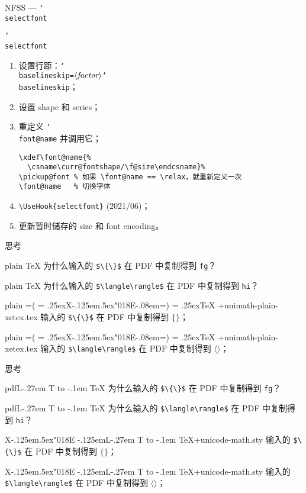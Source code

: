 \documentclass{beamer}
\makeatletter
\DeclareRobustCommand\LaTeX{L\kern-.27em%
  {\sbox\z@ T%
   \vbox to\ht\z@{\hbox{\check@mathfonts
                        \fontsize\sf@size\z@
                        \math@fontsfalse\selectfont
                        A}%
                  \vss}%
  }%
  \kern-.1em%
  \TeX}
\DeclareRobustCommand\xe{X\kern-.125em\lower.5ex\hbox{\char"018E}\kern-.08em}
\DeclareRobustCommand\xelatex{X\kern-.125em\lower.5ex\hbox{\char"018E}%
  \kern-.125em\LaTeX}
\DeclareRobustCommand\pdflatex{pdf\LaTeX}
\DeclareRobustCommand\exfall[2][.25]{\setbox0=\hbox{#2}%
  \dp0=\z@
  \leavevmode@ifvmode\lower#1ex\box0\relax}
\DeclareRobustCommand\cs[1]{\texttt{\char`\\#1}}
\DeclareRobustCommand\meta[1]{$\langle\hbox{\itshape#1}\rangle$}
\makeatother
\begin{document}
\begin{frame}[fragile]{NFSS --- \cs{selectfont}}
\begin{exampleblock}{\cs{selectfont}}
\begin{enumerate}
\item 设置行距：\cs{baselineskip}\;\texttt=\;\meta{factor}\cs{baselineskip}；
\item 设置 shape 和 series；
\item 重定义 \cs{font@name} 并调用它；
\begingroup
\color{gray}\scriptsize
\begin{verbatim}
\xdef\font@name{%
  \csname\curr@fontshape/\f@size\endcsname}%
\pickup@font % 如果 \font@name == \relax，就重新定义一次
\font@name   % 切换字体
\end{verbatim}
\endgroup
\item \verb|\UseHook{selectfont}| (2021/06)；
\item 更新暂时储存的 size 和 font encoding。
\end{enumerate}
\end{exampleblock}
\end{frame}

\begin{frame}[fragile]{思考}
\begin{exampleblock}{plain \TeX}
为什么输入的 \verb|$\{\}$| 在 PDF 中复制得到 \texttt{fg}？
\end{exampleblock}
\begin{exampleblock}{plain \TeX}
为什么输入的 \verb|$\langle\rangle$| 在 PDF 中复制得到 \texttt{hi}？
\end{exampleblock}
\begin{exampleblock}{plain \exfall(\xe\exfall)\TeX%
  \;+\;\textsf{unimath-plain-xetex.tex}}
输入的 \verb|$\{\}$| 在 PDF 中复制得到 $\{\}$；
\end{exampleblock}
\begin{exampleblock}{plain \exfall(\xe\exfall)\TeX%
  \;+\;\textsf{unimath-plain-xetex.tex}}
输入的 \verb|$\langle\rangle$| 在 PDF 中复制得到 $\langle\rangle$；
\end{exampleblock}
\end{frame}

\begin{frame}[fragile]{思考}
\begin{exampleblock}{\pdflatex}
为什么输入的 \verb|$\{\}$| 在 PDF 中复制得到 \texttt{fg}？
\end{exampleblock}
\begin{exampleblock}{\pdflatex}
为什么输入的 \verb|$\langle\rangle$| 在 PDF 中复制得到 \texttt{hi}？
\end{exampleblock}
\begin{exampleblock}{\xelatex\;+\;\textsf{unicode-math.sty}}
输入的 \verb|$\{\}$| 在 PDF 中复制得到 $\{\}$；
\end{exampleblock}
\begin{exampleblock}{\xelatex\;+\;\textsf{unicode-math.sty}}
输入的 \verb|$\langle\rangle$| 在 PDF 中复制得到 $\langle\rangle$；
\end{exampleblock}
\end{frame}
\end{document}
